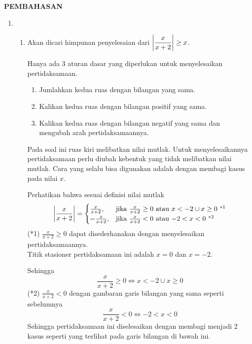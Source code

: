 \begin{center}
\textbf{\large{PEMBAHASAN}}
\end{center}
\begin{enumerate}[leftmargin=*, label={\arabic*}.]
\item
    \begin{enumerate}[label={\alph*}.]
    \item Akan dicari himpunan penyelesaian dari 
    $\ds \abs*{\frac{x}{x+2}} \geq x$.

    Hanya ada 3 aturan dasar yang diperlukan untuk menyelesaikan pertidaksamaan.
        \begin{enumerate}[label={\arabic*})]
        \item Jumlahkan kedua ruas dengan bilangan yang sama.
        \item Kalikan kedua ruas dengan bilangan positif yang sama.
        \item Kalikan kedua ruas dengan bilangan negatif yang sama dan 
        mengubah arah pertidaksamaannya.
        \end{enumerate}
    Pada soal ini ruas kiri melibatkan nilai mutlak. Untuk menyelesaikannya 
    pertidaksamaan perlu diubah kebentuk yang tidak melibatkan nilai mutlak. 
    Cara yang selalu bisa digunakan adalah dengan membagi kasus pada nilai $x$.
        
    Perhatikan bahwa sesuai definisi nilai mutlak
    \[
    \abs*{\frac{x}{x+2}} = 
    \begin{cases}
        \frac{x}{x+2}, &\text{jika $\frac{x}{x+2} \geq 0$ atau $x < -2 \cup x \geq 0$ $^{*1}$}\\
        -\frac{x}{x+2}, &\text{jika $\frac{x}{x+2} < 0$ atau $-2 < x < 0$ $^{*2}$}
    \end{cases}
    \]
    (*1) $\frac{x}{x+2} \geq 0$ dapat disederhanakan dengan menyelesaikan 
    pertidaksamaannya. \\Titik stasioner pertidaksamaan ini adalah $x= 0$ dan $x=-2$.
    
    
    
    Sehingga
    \[
        \frac{x}{x+2} \geq 0 \iff x < -2 \cup x \geq 0
    \]
    (*2) $\frac{x}{x+2} < 0$ dengan gambaran garis bilangan yang sama seperti sebelumnya
    \[
        \frac{x}{x+2} < 0 \iff -2 < x < 0
    \]
    Sehingga pertidaksamaan ini diselesaikan dengan membagi menjadi 2 kasus seperti 
    yang terlihat pada garis bilangan di bawah ini.

    


\end{enumerate}
\end{enumerate}
